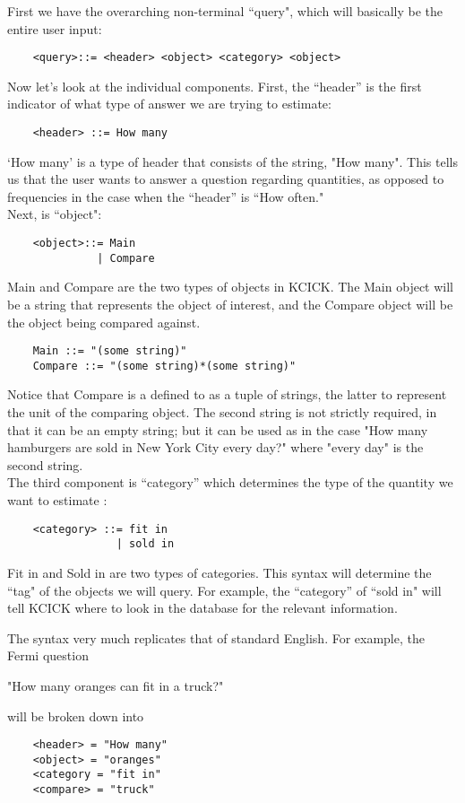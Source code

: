 \documentclass{article}
\begin{document}
First we have the overarching non-terminal ``query", which will basically be the entire user input:
\begin{verbatim}
    <query>::= <header> <object> <category> <object>
\end{verbatim}

Now let's look at the individual components. 
First, the ``header'' is the first indicator of what type of answer we are trying to estimate: 
\begin{verbatim}
    <header> ::= How many 
\end{verbatim}
`How many' is a type of header that consists of the string, "How many". This tells us that the user wants to answer a question regarding quantities, as opposed to frequencies in the case when the ``header'' is ``How often."\\

Next, is ``object":
\begin{verbatim}
    <object>::= Main
              | Compare
\end{verbatim}
Main and Compare are the two types of objects in KCICK. The Main object will be a string that represents the object of interest, and the Compare object will be the object being compared against. 
\begin{verbatim}
    Main ::= "(some string)"
    Compare ::= "(some string)*(some string)"
\end{verbatim}
Notice that Compare is a defined to as a tuple of strings, the latter to represent the unit of the comparing object. The second string is not strictly required, in that it can be an empty string; but it can be used as in the case "How many hamburgers are sold in New York City every day?" where "every day" is the second string. \\

The third component is ``category'' which determines the type of the quantity we want to estimate :
\begin{verbatim}
    <category> ::= fit in
                 | sold in
\end{verbatim}
Fit in and Sold in are two types of categories. This syntax will determine the ``tag" of the objects we will query. For example, the ``category'' of ``sold in" will tell KCICK where to look in the database for the relevant information.

The syntax very much replicates that of standard English. For example, the Fermi question
\begin{center}
"How many oranges can fit in a truck?"
\end{center}
will be broken down into 
\begin{verbatim}
    <header> = "How many" 
    <object> = "oranges"
    <category = "fit in"
    <compare> = "truck"
\end{verbatim}
\end{document}
